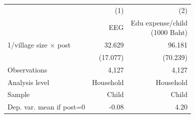 \begin{center} \begin{threeparttable} \begin{tabular}{l*{2}{r}} \hline \hline 
                    &         (1)&         (2)\\
                    &         EEG&\shortstack{Edu expense/child\\(1000 Baht)}\\
\hline
1/village size $\times$ post&      32.629&      96.181\\
                    &    (17.077)&    (70.239)\\
\hline
Observations        &       4,127&       4,127\\
Analysis level      &   Household&   Household\\
Sample              &       Child&       Child\\
Dep. var. mean if post=0&       -0.08&        4.20\\
\hline \end{tabular} \end{threeparttable} \end{center}

